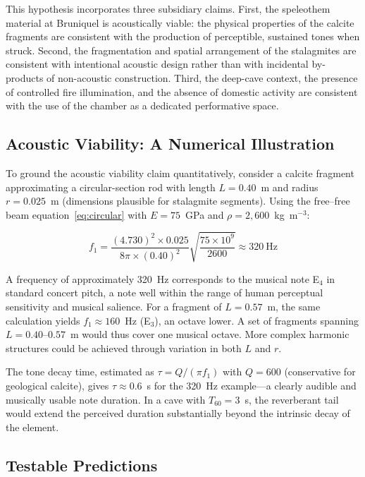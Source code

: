 \documentclass[12pt]{article}
\begin{document}
This hypothesis incorporates three subsidiary claims. First, the speleothem material at Bruniquel is acoustically viable: the physical properties of the calcite fragments are consistent with the production of perceptible, sustained tones when struck. Second, the fragmentation and spatial arrangement of the stalagmites are consistent with intentional acoustic design rather than with incidental by-products of non-acoustic construction. Third, the deep-cave context, the presence of controlled fire illumination, and the absence of domestic activity are consistent with the use of the chamber as a dedicated performative space.

\subsection{Acoustic Viability: A Numerical Illustration}

To ground the acoustic viability claim quantitatively, consider a calcite fragment approximating a circular-section rod with length $L = 0.40$~m and radius $r = 0.025$~m (dimensions plausible for stalagmite segments). Using the free--free beam equation~\eqref{eq:circular} with $E = 75$~GPa and $\rho = 2{,}600$~kg~m$^{-3}$:

\begin{equation}
f_1 = \frac{(4.730)^2 \times 0.025}{8\pi \times (0.40)^2}\sqrt{\frac{75 \times 10^9}{2600}} \approx 320~\text{Hz}
\end{equation}

A frequency of approximately 320~Hz corresponds to the musical note E$_4$ in standard concert pitch, a note well within the range of human perceptual sensitivity and musical salience. For a fragment of $L = 0.57$~m, the same calculation yields $f_1 \approx 160$~Hz (E$_3$), an octave lower. A set of fragments spanning $L = 0.40$--$0.57$~m would thus cover one musical octave. More complex harmonic structures could be achieved through variation in both $L$ and $r$.

The tone decay time, estimated as $\tau = Q/(\pi f_1)$ with $Q = 600$ (conservative for geological calcite), gives $\tau \approx 0.6$~s for the 320~Hz example—a clearly audible and musically usable note duration. In a cave with $T_{60} = 3$~s, the reverberant tail would extend the perceived duration substantially beyond the intrinsic decay of the element.

\subsection{Testable Predictions}
\end{document}
